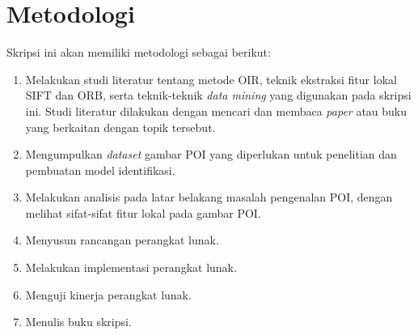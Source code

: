 \section{Metodologi}
\label{sec:metlit}
Skripsi ini akan memiliki metodologi sebagai berikut:
\begin{enumerate}
	\item Melakukan studi literatur tentang metode OIR, teknik ekstraksi fitur lokal SIFT dan ORB, serta teknik-teknik \textit{data mining} yang digunakan pada skripsi ini. Studi literatur dilakukan dengan mencari dan membaca \textit{paper} atau buku yang berkaitan dengan topik tersebut.
	\item Mengumpulkan \textit{dataset} gambar POI yang diperlukan untuk penelitian dan pembuatan model identifikasi.
	\item Melakukan analisis pada latar belakang masalah pengenalan POI, dengan melihat sifat-sifat fitur lokal pada gambar POI.
	\item Menyusun rancangan perangkat lunak.
	\item Melakukan implementasi perangkat lunak.
	\item Menguji kinerja perangkat lunak.
	\item Menulis buku skripsi.
\end{enumerate}
\newpage
